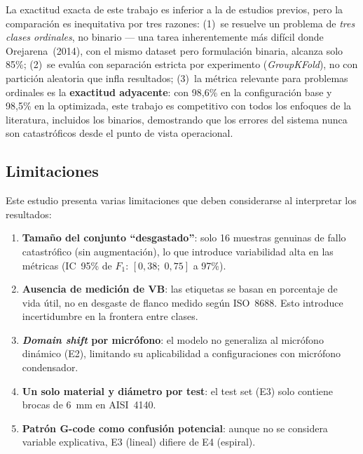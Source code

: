 \documentclass[10pt,twocolumn]{article}
\begin{document}
La exactitud exacta de este trabajo es inferior a la de estudios previos,
pero la comparación es inequitativa por tres razones: (1)~se resuelve un
problema de \textit{tres clases ordinales}, no binario --- una tarea
inherentemente más difícil donde Orejarena~(2014), con el mismo dataset
pero formulación binaria, alcanza solo 85\%; (2)~se evalúa con
separación estricta por experimento (\textit{GroupKFold}), no con
partición aleatoria que infla resultados; (3)~la métrica relevante para
problemas ordinales es la \textbf{exactitud adyacente}: con 98{,}6\% en
la configuración base y 98{,}5\% en la optimizada, este trabajo es
competitivo con todos los enfoques de la literatura, incluidos los
binarios, demostrando que los errores del sistema nunca son
catastróficos desde el punto de vista operacional.

\subsection{Limitaciones}

Este estudio presenta varias limitaciones que deben considerarse al
interpretar los resultados:

\begin{enumerate}
  \item \textbf{Tamaño del conjunto ``desgastado''}: solo 16 muestras
    genuinas de fallo catastrófico (sin augmentación), lo que introduce
    variabilidad alta en las métricas (IC~95\% de $F_1$:
    $[0{,}38;\; 0{,}75]$ a 97\%).
  \item \textbf{Ausencia de medición de VB}: las etiquetas se basan en
    porcentaje de vida útil, no en desgaste de flanco medido según
    ISO~8688. Esto introduce incertidumbre en la frontera entre clases.
  \item \textbf{\textit{Domain shift} por micrófono}: el modelo no
    generaliza al micrófono dinámico (E2), limitando su aplicabilidad a
    configuraciones con micrófono condensador.
  \item \textbf{Un solo material y diámetro por test}: el test set (E3)
    solo contiene brocas de 6~mm en AISI~4140.
  \item \textbf{Patrón G-code como confusión potencial}: aunque no se
    considera variable explicativa, E3 (lineal) difiere de E4 (espiral).
\end{enumerate}

\end{document}
